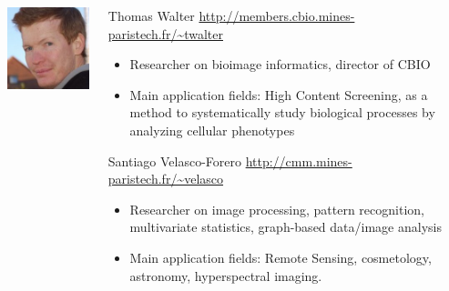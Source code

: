 \documentclass[xcolor=pdftex,dvipsnames,table,mathserif]{beamer}
\begin{document}
{\begin{columns}
\begin{column}{.2\textwidth}
\vspace{2em}
    \includegraphics[width=\textwidth]{ed.jpg}

  \end{column}
  \begin{column}{.8\textwidth}

    \begin{block}{Thomas Walter \hfill \scriptsize{\url{http://members.cbio.mines-paristech.fr/\~twalter}}}
      \scriptsize{
    \begin{itemize}
    \item Researcher on bioimage informatics, director of CBIO
    \item Main application fields: High Content Screening, as a method to systematically study biological processes by analyzing cellular phenotypes
    \end{itemize}
    }
  \end{block}

  \begin{block}{Santiago Velasco-Forero  \hfill \scriptsize{\url{http://cmm.mines-paristech.fr/\~velasco}}}
      \scriptsize{
    \begin{itemize}
    \item Researcher on image processing, pattern recognition, multivariate statistics, graph-based data/image analysis
    \item Main application fields: Remote Sensing, cosmetology, astronomy, hyperspectral imaging.
    \end{itemize}
    }
  \end{block}


\end{column}
\end{columns}}
\end{document}
